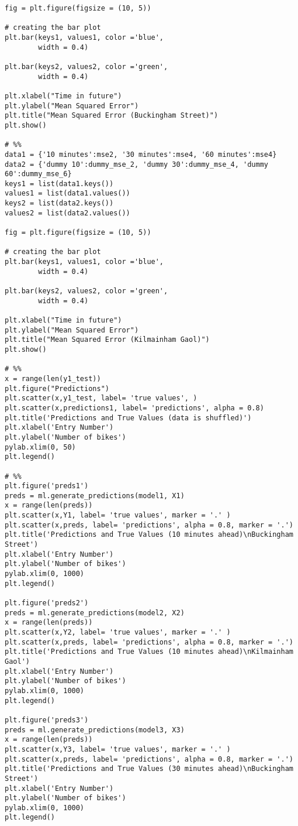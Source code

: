 \begin{verbatim}
fig = plt.figure(figsize = (10, 5))
 
# creating the bar plot
plt.bar(keys1, values1, color ='blue',
        width = 0.4)

plt.bar(keys2, values2, color ='green',
        width = 0.4)

plt.xlabel("Time in future")
plt.ylabel("Mean Squared Error")
plt.title("Mean Squared Error (Buckingham Street)")
plt.show()

# %%
data1 = {'10 minutes':mse2, '30 minutes':mse4, '60 minutes':mse4}
data2 = {'dummy 10':dummy_mse_2, 'dummy 30':dummy_mse_4, 'dummy 60':dummy_mse_6}
keys1 = list(data1.keys())
values1 = list(data1.values())
keys2 = list(data2.keys())
values2 = list(data2.values())
  
fig = plt.figure(figsize = (10, 5))
 
# creating the bar plot
plt.bar(keys1, values1, color ='blue',
        width = 0.4)

plt.bar(keys2, values2, color ='green',
        width = 0.4)

plt.xlabel("Time in future")
plt.ylabel("Mean Squared Error")
plt.title("Mean Squared Error (Kilmainham Gaol)")
plt.show()

# %%
x = range(len(y1_test))
plt.figure("Predictions")
plt.scatter(x,y1_test, label= 'true values', )
plt.scatter(x,predictions1, label= 'predictions', alpha = 0.8)
plt.title('Predictions and True Values (data is shuffled)')
plt.xlabel('Entry Number')
plt.ylabel('Number of bikes')
pylab.xlim(0, 50)
plt.legend()

# %%
plt.figure('preds1')
preds = ml.generate_predictions(model1, X1)
x = range(len(preds))
plt.scatter(x,Y1, label= 'true values', marker = '.' )
plt.scatter(x,preds, label= 'predictions', alpha = 0.8, marker = '.')
plt.title('Predictions and True Values (10 minutes ahead)\nBuckingham Street')
plt.xlabel('Entry Number')
plt.ylabel('Number of bikes')
pylab.xlim(0, 1000)
plt.legend()

plt.figure('preds2')
preds = ml.generate_predictions(model2, X2)
x = range(len(preds))
plt.scatter(x,Y2, label= 'true values', marker = '.' )
plt.scatter(x,preds, label= 'predictions', alpha = 0.8, marker = '.')
plt.title('Predictions and True Values (10 minutes ahead)\nKilmainham Gaol')
plt.xlabel('Entry Number')
plt.ylabel('Number of bikes')
pylab.xlim(0, 1000)
plt.legend()

plt.figure('preds3')
preds = ml.generate_predictions(model3, X3)
x = range(len(preds))
plt.scatter(x,Y3, label= 'true values', marker = '.' )
plt.scatter(x,preds, label= 'predictions', alpha = 0.8, marker = '.')
plt.title('Predictions and True Values (30 minutes ahead)\nBuckingham Street')
plt.xlabel('Entry Number')
plt.ylabel('Number of bikes')
pylab.xlim(0, 1000)
plt.legend()


\end{verbatim}
